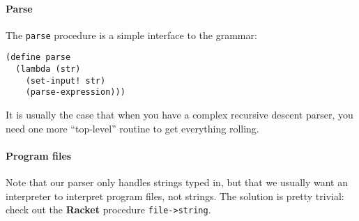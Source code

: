 \documentclass{article}
\begin{document}
\paragraph{Parse}
The {\tt parse} procedure is a simple interface to the grammar:
\begin{Verbatim}[frame=single]
(define parse
  (lambda (str)
    (set-input! str)
    (parse-expression)))
\end{Verbatim}
It is usually the case that when you have a complex recursive descent
parser, you need one more ``top-level'' routine to get everything
rolling. 

\paragraph{Program files}

Note that our parser only handles strings typed in, but that we
usually want an interpreter to interpret program files, not strings.
The solution is pretty trivial:
check out the {\bf Racket} procedure {\tt file->string}.
\end{document}
